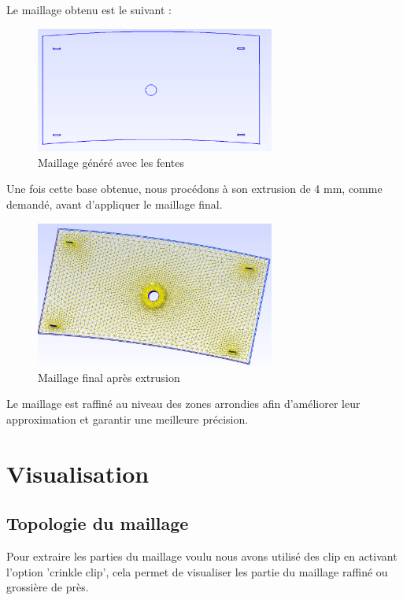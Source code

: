 \documentclass{article}
\begin{document}
Le maillage obtenu est le suivant :

\begin{figure}[H]
    \centering
    \includegraphics[width=0.7\textwidth]{images/gmsh_2.png}
    \caption{Maillage généré avec les fentes}
\end{figure}

Une fois cette base obtenue, nous procédons à son extrusion de 4 mm, comme demandé, avant d'appliquer le maillage final.

\begin{figure}[H]
    \centering
    \includegraphics[width=0.7\textwidth]{images/gmsh_3.png}
    \caption{Maillage final après extrusion}
\end{figure}

Le maillage est raffiné au niveau des zones arrondies afin d'améliorer leur approximation et garantir une meilleure précision.

\section{Visualisation}

\subsection{Topologie du maillage}

Pour extraire les parties du maillage voulu nous avons utilisé des clip en activant l'option 'crinkle clip', 
cela permet de visualiser les partie du maillage raffiné ou grossière de près.
\end{document}
